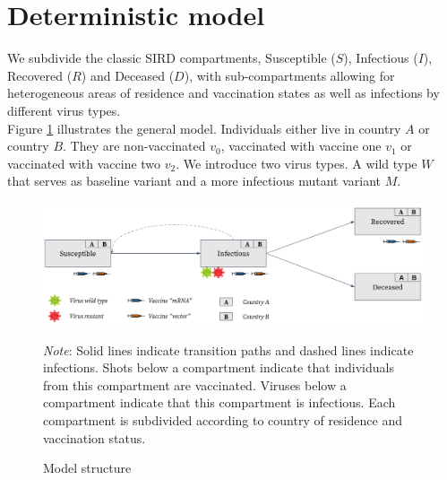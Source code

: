 \section{Deterministic model}
\label{sec:model}
We subdivide the classic SIRD compartments, Susceptible ($S$), Infectious ($I$), Recovered ($R$) and Deceased ($D$), with sub-compartments allowing for heterogeneous areas of residence and vaccination states as well as infections by different virus types. \\

Figure \ref{fig:model} illustrates the general model. Individuals either live in country $A$ or country $B$. They are non-vaccinated $v_0$, vaccinated with vaccine one $v_1$ or vaccinated with vaccine two $v_2$. We introduce two virus types. A wild type $W$ that serves as baseline variant and a more infectious mutant variant $M$.
\begin{figure}[h!]
\centering
\includegraphics[scale=0.26]{images/vaccination_pp_blue_orange.png}\\
\begin{flushleft}
\scriptsize{\textit{Note}: Solid lines indicate transition paths and dashed lines indicate infections. Shots below a compartment indicate that individuals from this compartment are vaccinated. Viruses below a compartment indicate that this compartment is infectious. Each compartment is subdivided according to country of residence and vaccination status.}
\end{flushleft}
\caption{Model structure}
\label{fig:model}
\end{figure}
